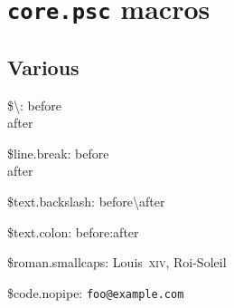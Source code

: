 \documentclass[demo]{pyscribe}
\begin{document}
\chapter{\texttt{core.psc} macros}

\section{Various}

\par\$\textbackslash{}: before \\ after
\par\$line.break: before \\ after

\par\$text.backslash: before\textbackslash{}after
\par\$text.colon: before\string:after
\par\$roman.smallcaps: Louis~\textsc{xiv}, Roi-Soleil
\par\$code.nopipe: \verb|foo@example.com|
\end{document}

